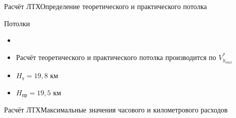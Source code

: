 \begin{frame}{Расчёт ЛТХ}{Определение теоретического и практического потолка}
    \begin{minipage}[c]{0.45\textwidth}
        \begin{block}{Потолки}
        \begin{itemize}
            \item <+-> []
            \item <+-> [] Расчёт теоретического и практического потолка производится по $V^*_{y_{max}}$
            \item <+-> [] $H_\text{т} = 19,8$ км 
            \item <+-> [] $H_\text{пр} = 19,5$ км
        \end{itemize}
        \end{block}
    \end{minipage}
    \begin{minipage}[c]{0.45\textwidth}
    \end{minipage}
\end{frame}

\begin{frame}{Расчёт ЛТХ}{Максимальные значения часового и километрового расходов}
\end{frame}

